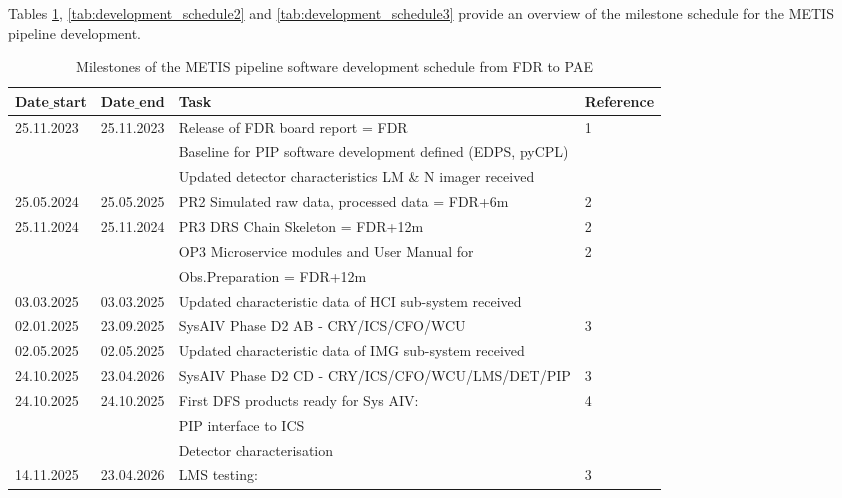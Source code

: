 Tables \ref{tab:development_schedule1}, \ref{tab:development_schedule2} and \ref{tab:development_schedule3} provide an overview of the milestone schedule for the METIS pipeline development.

\begin{table}[h!]
    \caption[Development schedule 1]{Milestones of the METIS pipeline software development schedule from FDR to PAE}
  \label{tab:development_schedule1}

\centering
\scriptsize
\begin{tabularx}{\textwidth}{llll}

\hline
Date$\_$start &	Date$\_$end   &	Task                            &		Reference \\
\hline\hline
25.11.2023 & 25.11.2023 & Release of FDR board report = FDR                &	1 \\
	  &		   & Baseline for PIP software development defined (EDPS, pyCPL) &	\\
    &    	 & Updated detector characteristics LM \& N imager received    &	\\
\hline
25.05.2024 & 25.05.2025 & PR2 Simulated raw data, processed data = FDR+6m &	2 \\
\hline
25.11.2024 & 25.11.2024 & PR3 DRS Chain Skeleton = FDR+12m                &	2 \\
	&		 &	OP3 Microservice modules and User Manual for              &	2 \\
    &        &  Obs.Preparation = FDR+12m                                 &	\\
\hline
03.03.2025 & 03.03.2025 & Updated characteristic data of HCI sub-system received & \\
\hline
02.01.2025 & 23.09.2025 & SysAIV Phase D2 AB - CRY/ICS/CFO/WCU            &	3 \\
\hline
02.05.2025 & 02.05.2025 & Updated characteristic data of IMG sub-system received & \\
\hline
24.10.2025 & 23.04.2026 & SysAIV Phase D2 CD - CRY/ICS/CFO/WCU/LMS/DET/PIP            &	3 \\
\hline
24.10.2025 & 24.10.2025 & First DFS products ready for Sys AIV:               &	4 \\
    &          &  PIP interface to ICS                                        &	\\
    &          &  Detector characterisation                                   &	\\
\hline
14.11.2025 & 23.04.2026 & LMS testing:                                        &	3 \\ 

\end{tabularx}
\end{table}
